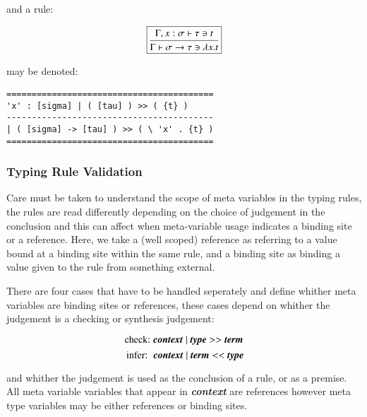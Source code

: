 {and a rule:

$$\boxed{
\mbox{\begin {prooftree}
  \hypo{\Gamma , x : \sigma \vdash \tau \ni t }
  \infer1[]{\Gamma \vdash \sigma \to \tau \ni \lambda x . t}
\end {prooftree}}
}$$

may be denoted:

\begin{center}
\begin{BVerbatim}
=========================================
'x' : [sigma] | ( [tau] ) >> ( {t} )
-----------------------------------------
| ( [sigma] -> [tau] ) >> ( \ 'x' . {t} )
=========================================
\end{BVerbatim}
\end{center}

\subsubsection{Typing Rule Validation}

Care must be taken to understand the scope of meta variables in the
typing rules, the rules are read differently depending on the choice
of judgement in the conclusion and this can affect when meta-variable
usage indicates a binding site or a reference. Here, we take a (well scoped)
reference as referring to a value bound at a binding site within the
same rule, and a binding site as binding a value given to the rule
from something external. 

There are four cases that have to be handled seperately and define
whither meta variables are binding sites or references, these cases
depend on whither the judgement is a checking or synthesis judgement:

$$\mbox{check: }\textbf{\emph{context}} \; \vert \; \textbf{\emph{type}}
>> \textbf{\emph{term}}$$
$$\mbox{ infer: }\;\textbf{\emph{context}} \; \vert \; \textbf{\emph{term}}
<< \textbf{\emph{type}}$$

and whither the judgement is used as the conclusion of a rule, or as a
premise. All meta variable variables that appear in 
\textbf{\emph{context}} are references however meta type variables may
be either references or binding sites.

}
